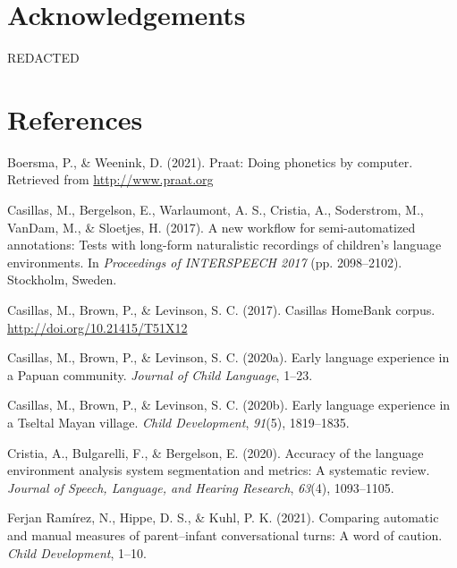 \documentclass[10pt, letterpaper]{article}
\begin{document}
\hypertarget{acknowledgements}{%
\section{Acknowledgements}\label{acknowledgements}}

REDACTED

\hypertarget{references}{%
\section{References}\label{references}}

\setlength{\parindent}{-0.1in} 
\setlength{\leftskip}{0.125in}

\noindent

\hypertarget{refs}{}
\leavevmode\hypertarget{ref-PRAAT}{}%
Boersma, P., \& Weenink, D. (2021). Praat: Doing phonetics by computer.
Retrieved from \url{http://www.praat.org}

\leavevmode\hypertarget{ref-casillas2017workflow}{}%
Casillas, M., Bergelson, E., Warlaumont, A. S., Cristia, A., Soderstrom,
M., VanDam, M., \& Sloetjes, H. (2017). A new workflow for
semi-automatized annotations: Tests with long-form naturalistic
recordings of children's language environments. In \emph{Proceedings of
INTERSPEECH 2017} (pp. 2098--2102). Stockholm, Sweden.

\leavevmode\hypertarget{ref-Casillas-HB}{}%
Casillas, M., Brown, P., \& Levinson, S. C. (2017). Casillas HomeBank
corpus. \url{http://doi.org/10.21415/T51X12}

\leavevmode\hypertarget{ref-casillas2020rossel}{}%
Casillas, M., Brown, P., \& Levinson, S. C. (2020a). Early language
experience in a Papuan community. \emph{Journal of Child Language},
1--23.

\leavevmode\hypertarget{ref-casillas2020tseltal}{}%
Casillas, M., Brown, P., \& Levinson, S. C. (2020b). Early language
experience in a Tseltal Mayan village. \emph{Child Development},
\emph{91}(5), 1819--1835.

\leavevmode\hypertarget{ref-cristia2020accuracy}{}%
Cristia, A., Bulgarelli, F., \& Bergelson, E. (2020). Accuracy of the
language environment analysis system segmentation and metrics: A
systematic review. \emph{Journal of Speech, Language, and Hearing
Research}, \emph{63}(4), 1093--1105.

\leavevmode\hypertarget{ref-ferjan2021comparing}{}%
Ferjan Ramírez, N., Hippe, D. S., \& Kuhl, P. K. (2021). Comparing
automatic and manual measures of parent--infant conversational turns: A
word of caution. \emph{Child Development}, 1--10.
\end{document}
